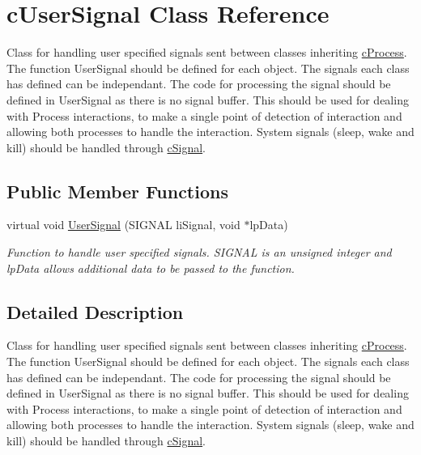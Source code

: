 \hypertarget{classc_user_signal}{
\section{cUserSignal Class Reference}
\label{classc_user_signal}
}


Class for handling user specified signals sent between classes inheriting \hyperlink{classc_process}{cProcess}. The function UserSignal should be defined for each object. The signals each class has defined can be independant. The code for processing the signal should be defined in UserSignal as there is no signal buffer. This should be used for dealing with Process interactions, to make a single point of detection of interaction and allowing both processes to handle the interaction. System signals (sleep, wake and kill) should be handled through \hyperlink{classc_signal}{cSignal}.  


\subsection*{Public Member Functions}
\begin{DoxyCompactItemize}
\item 
\hypertarget{classc_user_signal_ab11af50af566f1df2a8cf41902e1ac9f}{
virtual void \hyperlink{classc_user_signal_ab11af50af566f1df2a8cf41902e1ac9f}{UserSignal} (SIGNAL liSignal, void $\ast$lpData)}
\label{classc_user_signal_ab11af50af566f1df2a8cf41902e1ac9f}

\begin{DoxyCompactList}\small\item\em Function to handle user specified signals. SIGNAL is an unsigned integer and lpData allows additional data to be passed to the function. \end{DoxyCompactList}\end{DoxyCompactItemize}


\subsection{Detailed Description}
Class for handling user specified signals sent between classes inheriting \hyperlink{classc_process}{cProcess}. The function UserSignal should be defined for each object. The signals each class has defined can be independant. The code for processing the signal should be defined in UserSignal as there is no signal buffer. This should be used for dealing with Process interactions, to make a single point of detection of interaction and allowing both processes to handle the interaction. System signals (sleep, wake and kill) should be handled through \hyperlink{classc_signal}{cSignal}. 